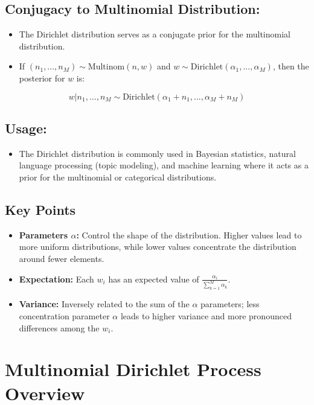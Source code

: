 \documentclass[10pt]{article}
\begin{document}
\subsection*{Conjugacy to Multinomial Distribution:}
\begin{itemize}
  \item The Dirichlet distribution serves as a conjugate prior for the multinomial distribution.
  \item If \( (n_1, ..., n_M) \sim \text{Multinom}(n, w) \) and \( w \sim \text{Dirichlet}(\alpha_1, ..., \alpha_M) \), then the posterior for \( w \) is:
\end{itemize}

\[ w | n_1, ..., n_M \sim \text{Dirichlet}(\alpha_1 + n_1, ..., \alpha_M + n_M) \]

\subsection*{Usage:}
\begin{itemize}
  \item The Dirichlet distribution is commonly used in Bayesian statistics, natural language processing (topic modeling), and machine learning where it acts as a prior for the multinomial or categorical distributions.
\end{itemize}

\subsection*{Key Points}
\begin{itemize}
  \item \textbf{Parameters \( \alpha \):} Control the shape of the distribution. Higher values lead to more uniform distributions, while lower values concentrate the distribution around fewer elements.
  \item \textbf{Expectation:} Each \( w_i \) has an expected value of \( \frac{\alpha_i}{\sum_{k=1}^M \alpha_k} \).
  \item \textbf{Variance:} Inversely related to the sum of the \( \alpha \) parameters; less concentration parameter \( \alpha \) leads to higher variance and more pronounced differences among the \( w_i \).
\end{itemize}


\section*{Multinomial Dirichlet Process Overview}
\end{document}
